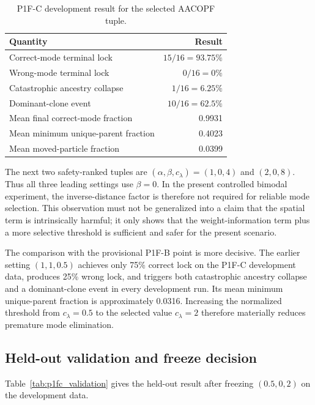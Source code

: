 \begin{table}[htbp]
    \centering
    \caption{P1F-C development result for the selected AACOPF tuple.}
    \label{tab:p1fc_development}
    \begin{tabular}{lr}
        \toprule
        Quantity & Result\\
        \midrule
        Correct-mode terminal lock & $15/16=93.75\%$\\
        Wrong-mode terminal lock & $0/16=0\%$\\
        Catastrophic ancestry collapse & $1/16=6.25\%$\\
        Dominant-clone event & $10/16=62.5\%$\\
        Mean final correct-mode fraction & 0.9931\\
        Mean minimum unique-parent fraction & 0.4023\\
        Mean moved-particle fraction & 0.0399\\
        \bottomrule
    \end{tabular}
\end{table}

The next two safety-ranked tuples are $(\alpha,\beta,c_\lambda)=(1,0,4)$ and $(2,0,8)$. Thus all three leading settings use $\beta=0$. In the present controlled bimodal experiment, the inverse-distance factor is therefore not required for reliable mode selection. This observation must not be generalized into a claim that the spatial term is intrinsically harmful; it only shows that the weight-information term plus a more selective threshold is sufficient and safer for the present scenario.

The comparison with the provisional P1F-B point is more decisive. The earlier setting $(1,1,0.5)$ achieves only 75\% correct lock on the P1F-C development data, produces 25\% wrong lock, and triggers both catastrophic ancestry collapse and a dominant-clone event in every development run. Its mean minimum unique-parent fraction is approximately 0.0316. Increasing the normalized threshold from $c_\lambda=0.5$ to the selected value $c_\lambda=2$ therefore materially reduces premature mode elimination.

\subsection{Held-out validation and freeze decision}
Table~\ref{tab:p1fc_validation} gives the held-out result after freezing $(0.5,0,2)$ on the development data.

